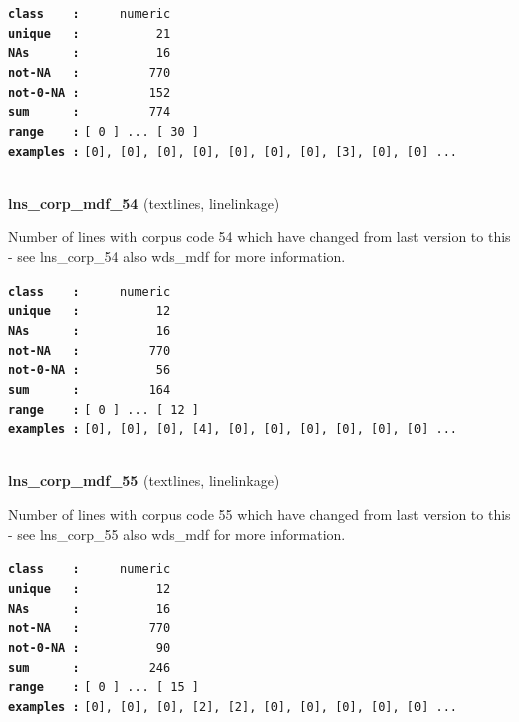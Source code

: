 \documentclass[]{article}
\begin{document}
\textbf{\texttt{class\ \ \ \ :}} \texttt{~~~~~numeric}\\
\textbf{\texttt{unique\ \ \ :}} \texttt{~~~~~~~~~~21}\\
\textbf{\texttt{NAs\ \ \ \ \ \ :}} \texttt{~~~~~~~~~~16}\\
\textbf{\texttt{not-NA\ \ \ :}} \texttt{~~~~~~~~~770}\\
\textbf{\texttt{not-0-NA\ :}} \texttt{~~~~~~~~~152}\\
\textbf{\texttt{sum\ \ \ \ \ \ :}} \texttt{~~~~~~~~~774}\\
\textbf{\texttt{range\ \ \ \ :}}
\texttt{{[}\ 0\ {]}\ ...\ {[}\ 30\ {]}}\\
\textbf{\texttt{examples\ :}}
\texttt{{[}0{]},\ {[}0{]},\ {[}0{]},\ {[}0{]},\ {[}0{]},\ {[}0{]},\ {[}0{]},\ {[}3{]},\ {[}0{]},\ {[}0{]}\ ...}\\

~

\textbf{lns\_corp\_mdf\_54} (textlines, linelinkage)

Number of lines with corpus code 54 which have changed from last version
to this - see lns\_corp\_54 also wds\_mdf for more information.

\textbf{\texttt{class\ \ \ \ :}} \texttt{~~~~~numeric}\\
\textbf{\texttt{unique\ \ \ :}} \texttt{~~~~~~~~~~12}\\
\textbf{\texttt{NAs\ \ \ \ \ \ :}} \texttt{~~~~~~~~~~16}\\
\textbf{\texttt{not-NA\ \ \ :}} \texttt{~~~~~~~~~770}\\
\textbf{\texttt{not-0-NA\ :}} \texttt{~~~~~~~~~~56}\\
\textbf{\texttt{sum\ \ \ \ \ \ :}} \texttt{~~~~~~~~~164}\\
\textbf{\texttt{range\ \ \ \ :}}
\texttt{{[}\ 0\ {]}\ ...\ {[}\ 12\ {]}}\\
\textbf{\texttt{examples\ :}}
\texttt{{[}0{]},\ {[}0{]},\ {[}0{]},\ {[}4{]},\ {[}0{]},\ {[}0{]},\ {[}0{]},\ {[}0{]},\ {[}0{]},\ {[}0{]}\ ...}\\

~

\textbf{lns\_corp\_mdf\_55} (textlines, linelinkage)

Number of lines with corpus code 55 which have changed from last version
to this - see lns\_corp\_55 also wds\_mdf for more information.

\textbf{\texttt{class\ \ \ \ :}} \texttt{~~~~~numeric}\\
\textbf{\texttt{unique\ \ \ :}} \texttt{~~~~~~~~~~12}\\
\textbf{\texttt{NAs\ \ \ \ \ \ :}} \texttt{~~~~~~~~~~16}\\
\textbf{\texttt{not-NA\ \ \ :}} \texttt{~~~~~~~~~770}\\
\textbf{\texttt{not-0-NA\ :}} \texttt{~~~~~~~~~~90}\\
\textbf{\texttt{sum\ \ \ \ \ \ :}} \texttt{~~~~~~~~~246}\\
\textbf{\texttt{range\ \ \ \ :}}
\texttt{{[}\ 0\ {]}\ ...\ {[}\ 15\ {]}}\\
\textbf{\texttt{examples\ :}}
\texttt{{[}0{]},\ {[}0{]},\ {[}0{]},\ {[}2{]},\ {[}2{]},\ {[}0{]},\ {[}0{]},\ {[}0{]},\ {[}0{]},\ {[}0{]}\ ...}\\
\end{document}
